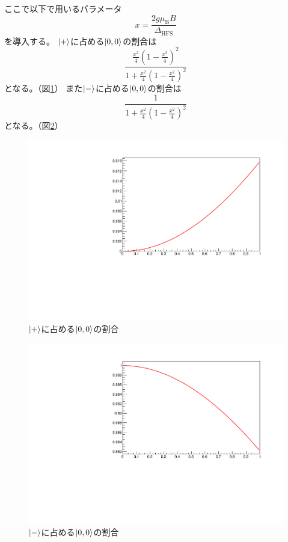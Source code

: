 ここで以下で用いるパラメータ
\begin{equation}
	\nonumber
	x = \frac{2g\mu_{\mathrm{B}}B}{\Delta_{\mathrm{HFS}}}
\end{equation}
を導入する。
$\ket{+}$に占める$\ket{0,0}$の割合は
\begin{equation}
	\nonumber
\frac{ \frac{x^{2}}{4} \left(1-\frac{x^{2}}{4}\right)^{2}  }{  1+\frac{x^{2}}{4}\left( 1-\frac{x^{2}}{4} \right)^2   }
\end{equation}
となる。（図\ref{fig:plusstate}）
また$\ket{-}$に占める$\ket{0,0}$の割合は
\begin{equation}
	\nonumber
\frac{1}{1+\frac{x^{2}}{4}\left(1-\frac{x^{2}}{4}\right)^{2}}
\end{equation}
となる。（図\ref{fig:minusstate}）

\begin{figure}[H]
\centering
\includegraphics[keepaspectratio,angle=270,scale=0.6]{fig/ybm/plusstate.pdf}
\caption{$\ket{+}$に占める$\ket{0,0}$の割合}
\label{fig:plusstate}
\end{figure}

\begin{figure}[H]
\centering
\includegraphics[keepaspectratio,angle=270,scale=0.6]{fig/ybm/minusstate.pdf}
\caption{$\ket{-}$に占める$\ket{0,0}$の割合}
\label{fig:minusstate}
\end{figure}

